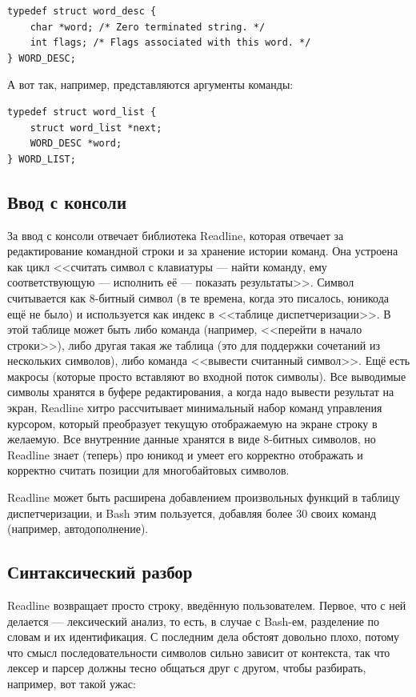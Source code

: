 \documentclass[a5paper]{article}
\begin{document}
\begin{verbatim}
typedef struct word_desc {
    char *word; /* Zero terminated string. */
    int flags; /* Flags associated with this word. */
} WORD_DESC;
\end{verbatim}

А вот так, например, представляются аргументы команды:

\begin{verbatim}
typedef struct word_list {
    struct word_list *next;
    WORD_DESC *word;
} WORD_LIST;
\end{verbatim}

\subsection{Ввод с консоли}

За ввод с консоли отвечает библиотека Readline, которая отвечает за редактирование командной строки и за хранение истории команд. Она устроена как цикл <<считать символ с клавиатуры --- найти команду, ему соответствующую --- исполнить её --- показать результаты>>. Символ считывается как 8-битный символ (в те времена, когда это писалось, юникода ещё не было) и используется как индекс в <<таблице диспетчеризации>>. В этой таблице может быть либо команда (например, <<перейти в начало строки>>), либо другая такая же таблица (это для поддержки сочетаний из нескольких символов), либо команда <<вывести считанный символ>>. Ещё есть макросы (которые просто вставляют во входной поток символы). Все выводимые символы хранятся в буфере редактирования, а когда надо вывести результат на экран, Readline хитро рассчитывает минимальный набор команд управления курсором, который преобразует текущую отображаемую на экране строку в желаемую. Все внутренние данные хранятся в виде 8-битных символов, но Readline знает (теперь) про юникод и умеет его корректно отображать и корректно считать позиции для многобайтовых символов.

Readline может быть расширена добавлением произвольных функций в таблицу диспетчеризации, и Bash этим пользуется, добавляя более 30 своих команд (например, автодополнение).

\subsection{Синтаксический разбор}

Readline возвращает просто строку, введённую пользователем. Первое, что с ней делается --- лексический анализ, то есть, в случае с Bash-ем, разделение по словам и их идентификация. С последним дела обстоят довольно плохо, потому что смысл последовательности символов сильно зависит от контекста, так что лексер и парсер должны тесно общаться друг с другом, чтобы разбирать, например, вот такой ужас:
\end{document}

